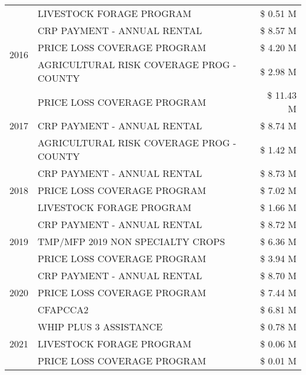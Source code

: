 \begin{tabular}{llr}
 & LIVESTOCK FORAGE PROGRAM & \$ 0.51 M \\
\cline{1-3}
\multirow[t]{3}{*}{2016} & CRP PAYMENT - ANNUAL RENTAL                   & \$ 8.57 M \\
 & PRICE LOSS COVERAGE PROGRAM                   & \$ 4.20 M \\
 & AGRICULTURAL RISK COVERAGE PROG - COUNTY      & \$ 2.98 M \\
\cline{1-3}
\multirow[t]{3}{*}{2017} & PRICE LOSS COVERAGE PROGRAM & \$ 11.43 M \\
 & CRP PAYMENT - ANNUAL RENTAL & \$ 8.74 M \\
 & AGRICULTURAL RISK COVERAGE PROG - COUNTY & \$ 1.42 M \\
\cline{1-3}
\multirow[t]{3}{*}{2018} & CRP PAYMENT - ANNUAL RENTAL & \$ 8.73 M \\
 & PRICE LOSS COVERAGE PROGRAM & \$ 7.02 M \\
 & LIVESTOCK FORAGE PROGRAM & \$ 1.66 M \\
\cline{1-3}
\multirow[t]{3}{*}{2019} & CRP PAYMENT - ANNUAL RENTAL & \$ 8.72 M \\
 & TMP/MFP 2019 NON SPECIALTY CROPS & \$ 6.36 M \\
 & PRICE LOSS COVERAGE PROGRAM & \$ 3.94 M \\
\cline{1-3}
\multirow[t]{3}{*}{2020} & CRP PAYMENT - ANNUAL RENTAL & \$ 8.70 M \\
 & PRICE LOSS COVERAGE PROGRAM & \$ 7.44 M \\
 & CFAPCCA2 & \$ 6.81 M \\
\cline{1-3}
\multirow[t]{3}{*}{2021} & WHIP PLUS 3 ASSISTANCE & \$ 0.78 M \\
 & LIVESTOCK FORAGE PROGRAM & \$ 0.06 M \\
 & PRICE LOSS COVERAGE PROGRAM & \$ 0.01 M \\
\cline{1-3}
\bottomrule
\end{tabular}
